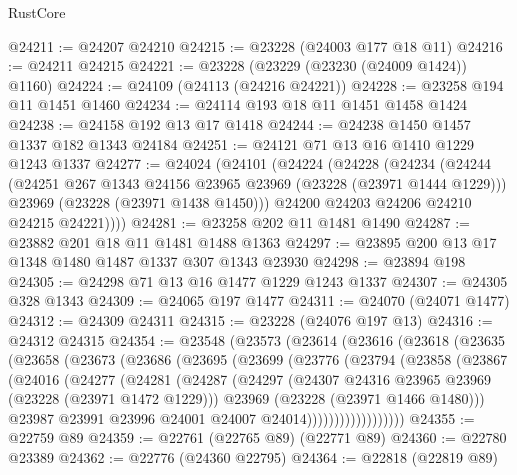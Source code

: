 \begin{lexlean}{RustCore}
\begin{coremodule}
@24211 := @24207 @24210
@24215 := @23228 (@24003 @177 @18 @11)
@24216 := @24211 @24215
@24221 := @23228 (@23229 (@23230 (@24009 @1424)) @1160)
@24224 := @24109 (@24113 (@24216 @24221))
@24228 := @23258 @194 @11 @1451 @1460
@24234 := @24114 @193 @18 @11 @1451 @1458 @1424
@24238 := @24158 @192 @13 @17 @1418
@24244 := @24238 @1450 @1457 @1337 @182 @1343 @24184
@24251 := @24121 @71 @13 @16 @1410 @1229 @1243 @1337
@24277 := @24024
    (@24101
      (@24224
        (@24228
          (@24234
            (@24244
              (@24251 @267 @1343 @24156 @23965 @23969 (@23228 (@23971 @1444 @1229)))
              @23969
              (@23228 (@23971 @1438 @1450)))
            @24200
            @24203
            @24206
            @24210
            @24215
            @24221))))
@24281 := @23258 @202 @11 @1481 @1490
@24287 := @23882 @201 @18 @11 @1481 @1488 @1363
@24297 := @23895 @200 @13 @17 @1348 @1480 @1487 @1337 @307 @1343 @23930
@24298 := @23894 @198
@24305 := @24298 @71 @13 @16 @1477 @1229 @1243 @1337
@24307 := @24305 @328 @1343
@24309 := @24065 @197 @1477
@24311 := @24070 (@24071 @1477)
@24312 := @24309 @24311
@24315 := @23228 (@24076 @197 @13)
@24316 := @24312 @24315
@24354 := @23548
    (@23573
      (@23614
        (@23616
          (@23618
            (@23635
              (@23658
                (@23673
                  (@23686
                    (@23695
                      (@23699
                        (@23776
                          (@23794
                            (@23858
                              (@23867
                                (@24016
                                  (@24277
                                    (@24281
                                      (@24287
                                        (@24297
                                          (@24307
                                            @24316
                                            @23965
                                            @23969
                                            (@23228 (@23971 @1472 @1229)))
                                          @23969
                                          (@23228 (@23971 @1466 @1480)))
                                        @23987
                                        @23991
                                        @23996
                                        @24001
                                        @24007
                                        @24014))))))))))))))))))
@24355 := @22759 @89
@24359 := @22761 (@22765 @89) (@22771 @89)
@24360 := @22780 @23389
@24362 := @22776 (@24360 @22795)
@24364 := @22818 (@22819 @89)

\end{coremodule}
\end{lexlean}
